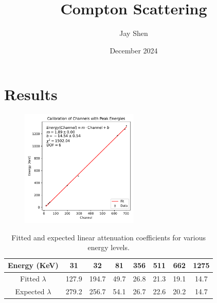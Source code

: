 \documentclass[12pt, letterpaper]{article}
\title{Compton Scattering}
\author{Jay Shen}
\date{December 2024}
\begin{document}
\maketitle

\section{Results}

\begin{figure}[!h]
    \centering
    \includegraphics[width=0.5\textwidth]{experiment2/figures/calibration.pdf}
    \caption{}
    \label{fig:cs137-spectrum}
\end{figure}

\begin{table}[h]
\centering
\begin{tabular}{|c | c c c c c c c |}
    \hline
    Energy (KeV) & 31 & 32 & 81 & 356 & 511 & 662 & 1275 \\
    \hline
    Fitted $\lambda$ & 127.9 & 194.7 & 49.7 & 26.8 & 21.3 & 19.1 & 14.7 \\
    Expected $\lambda$ & 279.2 & 256.7 & 54.1 & 26.7 & 22.6 & 20.2 & 14.7 \\
    \hline
\end{tabular}
\caption{Fitted and expected linear attenuation coefficients for various energy levels.}
\label{table:1}
\end{table}
\end{document}
